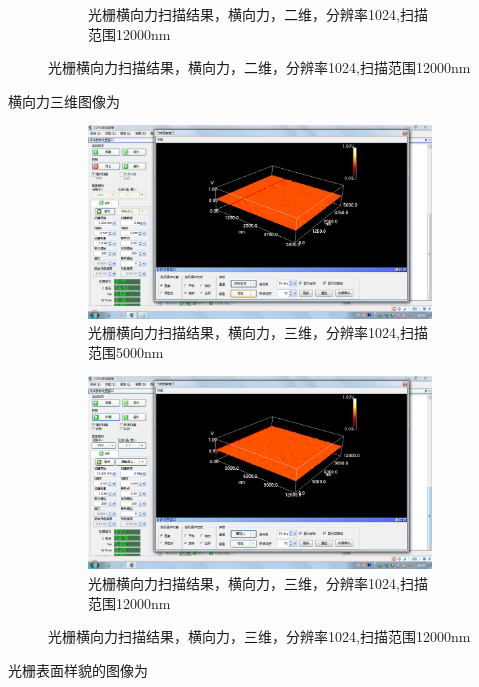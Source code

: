 \documentclass{ctexart}
\begin{document}
\begin{figure}[H]
\begin{subfigure}{.49\textwidth}
    \caption{光栅横向力扫描结果，横向力，二维，分辨率1024,扫描范围12000nm}
  \end{subfigure}
\end{figure}

横向力三维图像为

\begin{figure}[H]
  \centering
  \begin{subfigure}{.49\textwidth}
    \centering
    \includegraphics[width=\linewidth]{AFM结果图像/光栅横向力三维_1024_5000nm}
    \caption{光栅横向力扫描结果，横向力，三维，分辨率1024,扫描范围5000nm}
  \end{subfigure}
  \begin{subfigure}{.49\textwidth}
    \centering
    \includegraphics[width=\linewidth]{AFM结果图像/光栅横向力三维_1024_12000nm}
    \caption{光栅横向力扫描结果，横向力，三维，分辨率1024,扫描范围12000nm}
  \end{subfigure}
\end{figure}

光栅表面样貌的图像为
\end{document}
